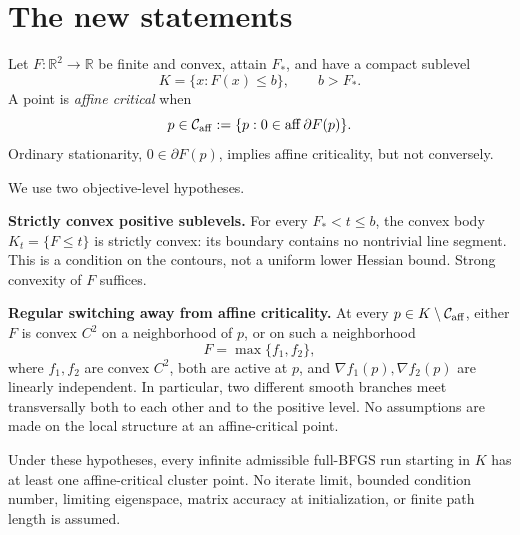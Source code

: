 \begingroup
\providecommand{\R}{}
\renewcommand{\R}{\mathbb R}
\providecommand{\aff}{}
\renewcommand{\aff}{\operatorname{aff}}
\providecommand{\conv}{}
\renewcommand{\conv}{\operatorname{conv}}
\providecommand{\tr}{}
\renewcommand{\tr}{\operatorname{tr}}
\providecommand{\dist}{}
\renewcommand{\dist}{\operatorname{dist}}
\providecommand{\Ca}{}
\renewcommand{\Ca}{\mathcal C_{\rm aff}}
\providecommand{\ip}{}
\renewcommand{\ip}[2]{\langle #1,#2\rangle}
\providecommand{\norm}{}
\renewcommand{\norm}[1]{\lVert #1\rVert}
\makeatletter\let\c@lemma\c@theorem\let\c@corollary\c@theorem\let\c@proposition\c@theorem\let\c@remark\c@theorem\makeatother
\renewcommand{\thelemma}{\thetheorem}\renewcommand{\thecorollary}{\thetheorem}\renewcommand{\theproposition}{\thetheorem}\renewcommand{\theremark}{\thetheorem}
\setcounter{section}{0}
\setcounter{theorem}{0}
\setcounter{equation}{0}
\section{The new statements}
Let $F:\R^2\to\R$ be finite and convex, attain $F_*$, and have a compact sublevel
\[
K=\{x:F(x)\le b\},\qquad b>F_*.
\]
A point is \emph{affine critical} when
\[
 p\in\Ca:=\{p:0\in\aff\partial F(p)\}.
\]
Ordinary stationarity, $0\in\partial F(p)$, implies affine criticality, but not conversely.

We use two objective-level hypotheses.

\textbf{Strictly convex positive sublevels.} For every $F_*<t\le b$, the convex body $K_t=\{F\le t\}$ is strictly convex: its boundary contains no nontrivial line segment. This is a condition on the contours, not a uniform lower Hessian bound. Strong convexity of $F$ suffices.

\textbf{Regular switching away from affine criticality.} At every $p\in K\setminus\Ca$, either $F$ is convex $C^2$ on a neighborhood of $p$, or on such a neighborhood
\[
 F=\max\{f_1,f_2\},
\]
where $f_1,f_2$ are convex $C^2$, both are active at $p$, and $\nabla f_1(p),\nabla f_2(p)$ are linearly independent. In particular, two different smooth branches meet transversally both to each other and to the positive level. No assumptions are made on the local structure at an affine-critical point.

\begin{theorem}\label{C:thm:cluster}
Under these hypotheses, every infinite admissible full-BFGS run starting in $K$ has at least one affine-critical cluster point. No iterate limit, bounded condition number, limiting eigenspace, matrix accuracy at initialization, or finite path length is assumed.
\end{theorem}

